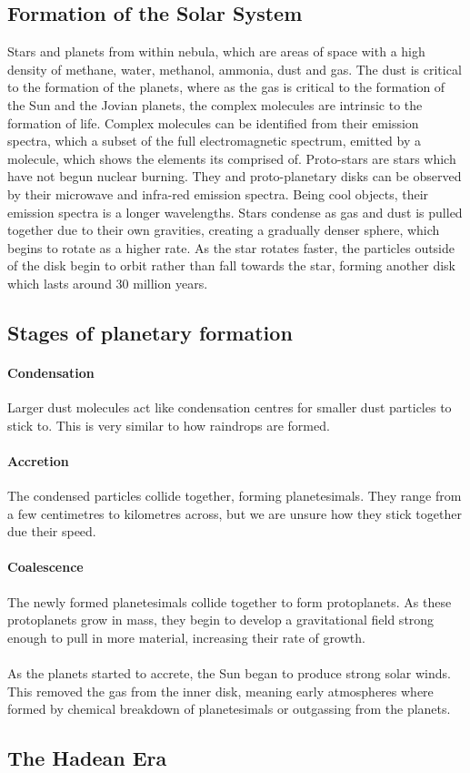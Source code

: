 \documentclass[12pt]{article}
\begin{document}
	\subsection{Formation of the Solar System}
	Stars and planets from within nebula, which are areas of space with a high density of methane, water, methanol, ammonia, dust and gas.
	The dust is critical to the formation of the planets, where as the gas is critical to the formation of the Sun and the Jovian planets, the complex molecules are intrinsic to the formation of life.
	Complex molecules can be identified from their emission spectra, which a subset of the full electromagnetic spectrum, emitted by a molecule, which shows the elements its comprised of.
	Proto-stars are stars which have not begun nuclear burning.
	They and proto-planetary disks can be observed by their microwave and infra-red emission spectra.
	Being cool objects, their emission spectra is a longer wavelengths.
	Stars condense as gas and dust is pulled together due to their own gravities, creating a gradually denser sphere, which begins to rotate as a higher rate.
	As the star rotates faster, the particles outside of the disk begin to orbit rather than fall towards the star, forming another disk which lasts around 30 million years.

	\subsection{Stages of planetary formation}
	\paragraph{Condensation}
		Larger dust molecules act like condensation centres for smaller dust particles to stick to.
		This is very similar to how raindrops are formed.
	\paragraph{Accretion}
		The condensed particles collide together, forming planetesimals.
		They range from a few centimetres to kilometres across, but we are unsure how they stick together due their speed.
	\paragraph{Coalescence}
		The newly formed planetesimals collide together to form protoplanets.
		As these protoplanets grow in mass, they begin to develop a gravitational field strong enough to pull in more material, increasing their rate of growth.
	\\
	\\
	As the planets started to accrete, the Sun began to produce strong solar winds.
	This removed the gas from the inner disk, meaning early atmospheres where formed by chemical breakdown of planetesimals or outgassing from the planets.

	\subsection{The Hadean Era}
	
\end{document}
